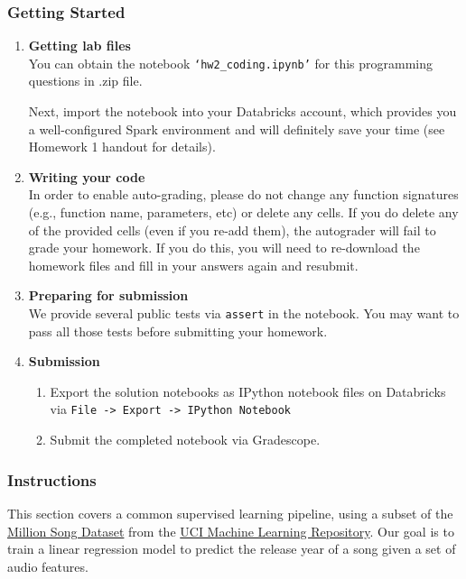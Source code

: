 \subsubsection{Getting Started}
\begin{enumerate}
    
\item \textbf{Getting lab files}\\
You can obtain the notebook \texttt{`hw2\_coding.ipynb'} for this programming questions in .zip file.

Next, import the notebook into your Databricks account, which provides you a well-configured Spark environment and will definitely save your time (see Homework 1 handout for details).

\item \textbf{Writing your code}\\
In order to enable auto-grading, please do not change any function signatures (e.g., function name, parameters, etc) or delete any cells. If you do delete any of the provided cells (even if you re-add them), the autograder will fail to grade your homework. If you do this, you will need to re-download the homework files and fill in your answers again and resubmit.

\item \textbf{Preparing for submission}\\
We provide several public tests via \texttt{assert} in the notebook. You may want to pass all those tests before submitting your homework. 

\item \textbf{Submission}
\begin{enumerate}
    \item Export the solution notebooks as IPython notebook files on Databricks via \texttt{File -> Export -> IPython Notebook}
    \item Submit the completed notebook via Gradescope.
\end{enumerate}

\end{enumerate}

\subsubsection{Instructions}
This section covers a common supervised learning pipeline, using a subset of the \href{http://millionsongdataset.com/}{Million Song Dataset} from the \href{https://archive.ics.uci.edu/ml/datasets/YearPredictionMSD}{UCI Machine Learning Repository}. Our goal is to train a linear regression model to predict the release year of a song given a set of audio features.

